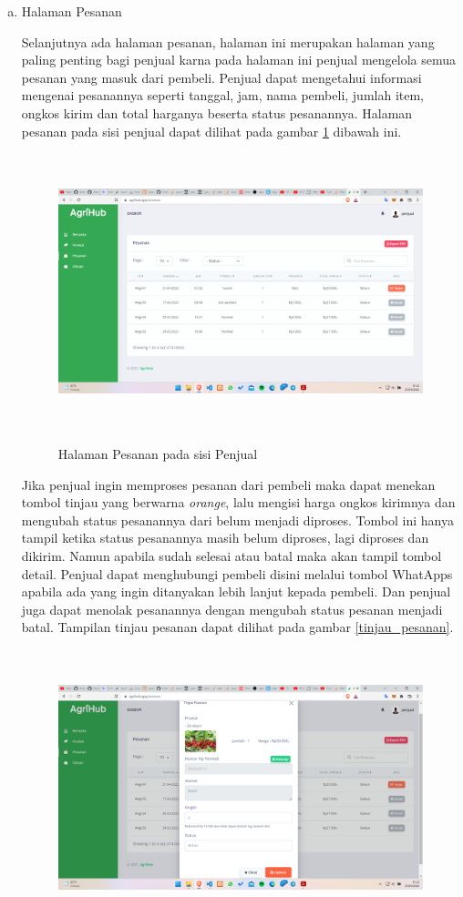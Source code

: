 \begin{enumerate}
\begin{enumerate}[a.]
		\item Halaman Pesanan
		\par Selanjutnya ada halaman pesanan, halaman ini merupakan halaman yang paling penting bagi penjual karna pada halaman ini penjual mengelola semua pesanan yang masuk dari pembeli. Penjual dapat mengetahui informasi mengenai pesanannya seperti tanggal, jam, nama pembeli, jumlah item, ongkos kirim dan total harganya beserta status pesanannya. Halaman pesanan pada sisi penjual dapat dilihat pada gambar \ref*{pesanan_penjual} dibawah ini.
		\begin{figure}[H]
			\centering
			{\includegraphics [width = 13.3cm, height= 8cm]{gambar/penjual/pesanan_penjual}}
			\caption{Halaman Pesanan pada sisi Penjual}
			\label{pesanan_penjual}
		\end{figure}
		\newpage
		\par Jika penjual ingin memproses pesanan dari pembeli maka dapat menekan tombol tinjau yang berwarna \textit{orange}, lalu mengisi harga ongkos kirimnya dan mengubah status pesanannya dari belum menjadi diproses. Tombol ini hanya tampil ketika status pesanannya masih belum diproses, lagi diproses dan dikirim. Namun apabila sudah selesai atau batal maka akan tampil tombol detail. Penjual dapat menghubungi pembeli disini melalui tombol WhatApps apabila ada yang ingin ditanyakan lebih lanjut kepada pembeli. Dan penjual juga dapat menolak pesanannya dengan mengubah status pesanan menjadi batal. Tampilan tinjau pesanan dapat dilihat pada gambar \ref*{tinjau_pesanan}.
		\begin{figure}[H]
			\centering
			{\includegraphics [width = 13.3cm, height= 8cm]{gambar/penjual/tinjau_pesanan}}

\end{figure}
\end{enumerate}
\end{enumerate}
